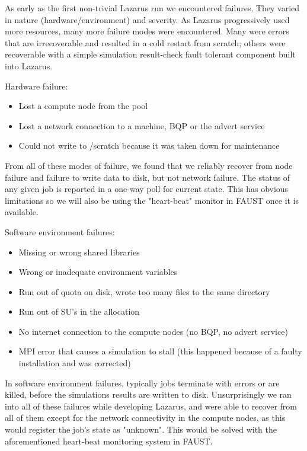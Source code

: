\documentclass[conference,final]{IEEEtran}
\newcommand{\jhanote}[1]{ {\textcolor{red} { ***Jha: #1 }}}
\newcommand{\yyenote}[1]{ {\textcolor{blue} { ***yye00: #1 }}}
\newcommand{\jhanote}[1]{}
\newcommand{\yyenote}[1]{}
\begin{document}
As early as the first non-trivial Lazarus run we encountered failures. They
varied in nature (hardware/environment) and severity. As Lazarus progressively
used more resources, many more failure modes were encountered.
Many were errors that are irrecoverable and resulted in a
cold restart from scratch; others were recoverable with a simple simulation 
result-check fault tolerant component built into Lazarus.

Hardware failure:
\begin{itemize}
\item{Lost a compute node from the pool}
\item{Lost a network connection to a machine, BQP or the advert service}
\item{Could not write to /scratch because it was taken down for maintenance}
\end{itemize}
From all of these modes of failure, we found that we reliably recover
from node failure and failure to write data to disk, but not network failure. The
status of any given job is reported in a one-way poll for current state. This
has obvious limitations so we will also be using the "heart-beat" monitor in FAUST
once it is available.

Software environment failures:
\begin{itemize}
\item{Missing or wrong shared libraries}
\item{Wrong or inadequate environment variables}
\item{Run out of quota on disk, wrote too many files to the same directory}
\item{Run out of SU's in the allocation}
\item{No internet connection to the compute nodes (no BQP, no advert service)}
\item{MPI error that causes a simulation to stall (this happened because of a faulty installation and was corrected)}
\end{itemize}
In software environment failures, typically jobs terminate with errors or 
are killed, before the simulations results are written to disk. Unsurprisingly we ran
into all of these failures while developing Lazarus, and were able
to recover from all of them except for the network connectivity in the compute
nodes, as this would register the job's state as "unknown". This would be solved
with the aforementioned heart-beat monitoring system in FAUST.
\end{document}
